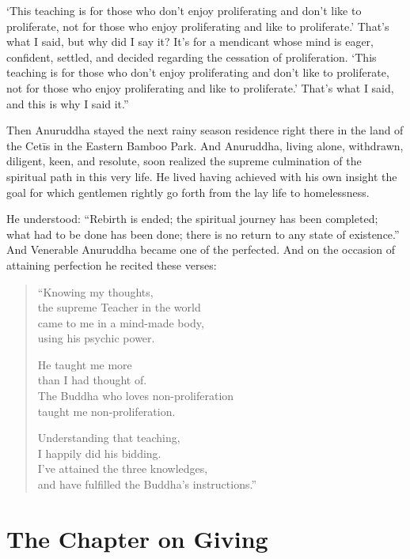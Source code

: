 \documentclass[12pt,openany]{book}%
\let\oldcontentsline\contentsline
\newcommand{\nopagecontentsline}[3]{\oldcontentsline{#1}{#2}{}}
\newcommand*{\tocchapterline}[1]{\bfseries\itshape{#1}}
\begin{document}
‘This teaching is for those who don’t enjoy proliferating and don’t like to proliferate, not for those who enjoy proliferating and like to proliferate.’ That’s what I said, but why did I say it? It’s for a mendicant whose mind is eager, confident, settled, and decided regarding the cessation of proliferation. ‘This teaching is for those who don’t enjoy proliferating and don’t like to proliferate, not for those who enjoy proliferating and like to proliferate.’ That’s what I said, and this is why I said it.” 

Then Anuruddha stayed the next rainy season residence right there in the land of the \textsanskrit{Cetīs} in the Eastern Bamboo Park. And Anuruddha, living alone, withdrawn, diligent, keen, and resolute, soon realized the supreme culmination of the spiritual path in this very life. He lived having achieved with his own insight the goal for which gentlemen rightly go forth from the lay life to homelessness. 

He understood: “Rebirth is ended; the spiritual journey has been completed; what had to be done has been done; there is no return to any state of existence.” And Venerable Anuruddha became one of the perfected. And on the occasion of attaining perfection he recited these verses: 

\begin{verse}%
“Knowing my thoughts, \\
the supreme Teacher in the world \\
came to me in a mind-made body, \\
using his psychic power. 

He taught me more \\
than I had thought of. \\
The Buddha who loves non-proliferation \\
taught me non-proliferation. 

Understanding that teaching, \\
I happily did his bidding. \\
I’ve attained the three knowledges, \\
and have fulfilled the Buddha’s instructions.” 

%
\end{verse}

%
\chapter*{The Chapter on Giving }
\addcontentsline{toc}{chapter}{\tocchapterline{The Chapter on Giving }}
\addtocontents{toc}{\let\protect\contentsline\protect\oldcontentsline}
\end{document}
